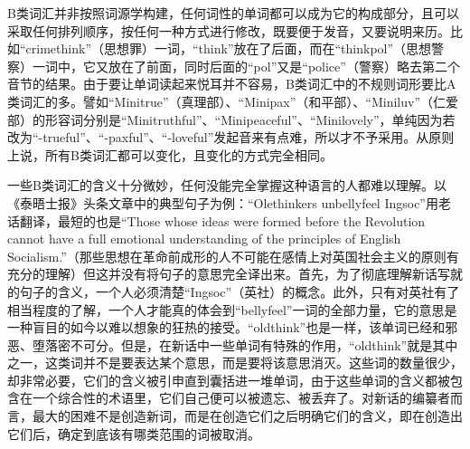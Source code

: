 B类词汇并非按照词源学构建，任何词性的单词都可以成为它的构成部分，且可以采取任何排列顺序，按任何一种方式进行修改，既要便于发音，又要说明来历。比如``crimethink''（思想罪）一词，``think''放在了后面，而在``thinkpol''（思想警察）一词中，它又放在了前面，同时后面的``pol''又是``police''（警察）略去第二个音节的结果。由于要让单词读起来悦耳并不容易，B类词汇中的不规则词形要比A类词汇的多。譬如``Minitrue''（真理部）、``Minipax''（和平部）、``Miniluv''（仁爱部）的形容词分别是``Minitruthful''、``Minipeaceful''、``Minilovely''，单纯因为若改为``-trueful''、``-paxful''、``-loveful''发起音来有点难，所以才不予采用。从原则上说，所有B类词汇都可以变化，且变化的方式完全相同。

一些B类词汇的含义十分微妙，任何没能完全掌握这种语言的人都难以理解。以《泰晤士报》头条文章中的典型句子为例：``Olethinkers
unbellyfeel Ingsoc''用老话翻译，最短的也是``Those whose ideas were
formed before the Revolution cannot have a full emotional understanding
of the principles of English
Socialism.''（那些思想在革命前成形的人不可能在感情上对英国社会主义的原则有充分的理解）但这并没有将句子的意思完全译出来。首先，为了彻底理解新话写就的句子的含义，一个人必须清楚``Ingsoc''（英社）的概念。此外，只有对英社有了相当程度的了解，一个人才能真的体会到``bellyfeel''一词的全部力量，它的意思是一种盲目的如今以难以想象的狂热的接受。``oldthink''也是一样，该单词已经和邪恶、堕落密不可分。但是，在新话中一些单词有特殊的作用，``oldthink''就是其中之一，这类词并不是要表达某个意思，而是要将该意思消灭。这些词的数量很少，却非常必要，它们的含义被引申直到囊括进一堆单词，由于这些单词的含义都被包含在一个综合性的术语里，它们自己便可以被遗忘、被丢弃了。对新话的编纂者而言，最大的困难不是创造新词，而是在创造它们之后明确它们的含义，即在创造出它们后，确定到底该有哪类范围的词被取消。

